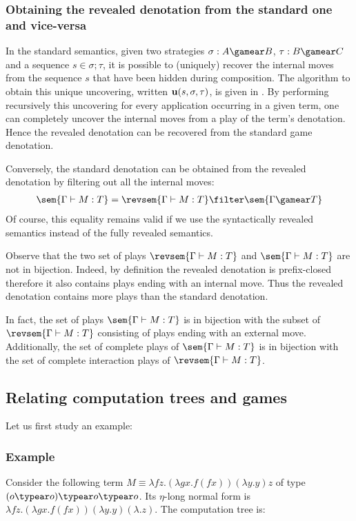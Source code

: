 \subsubsection{Obtaining the revealed denotation from the standard one and vice-versa}
\label{subsec:relating_revealed_and_standard_denotation}

In the standard semantics, given two strategies $\sigma : A
\gamear B$, $\tau : B \gamear C$ and a sequence $s \in
\sigma ; \tau$, it is possible to (uniquely) recover the
internal moves from the sequence $s$ that have been hidden during composition. The algorithm to obtain this unique uncovering, written ${\bf u}(s, \sigma, \tau)$, is given in \cite[part II]{hylandong_pcf}. By performing recursively this uncovering for every application occurring in a given term, one can completely uncover the internal moves from a play of the term's denotation.
Hence the revealed denotation can be recovered from the standard game denotation.

Conversely, the standard denotation can be obtained from the revealed denotation by filtering out all the internal moves:
\begin{eqnarray}
 \sem{\Gamma \vdash M : T} = \revsem{\Gamma \vdash M : T} \filter \sem{\Gamma \gamear T} \label{eqn:int_std_gamsem}
\end{eqnarray}
Of course, this equality remains valid if we use the syntactically revealed semantics instead of the fully revealed semantics.


Observe that the two set of plays $\revsem{\Gamma \vdash M : T}$ and $\sem{\Gamma \vdash M : T}$ are not in bijection.  Indeed, by definition the revealed denotation is prefix-closed therefore it also contains plays ending with an internal move. Thus the revealed denotation contains more plays than the standard denotation.

In fact, the set of plays $\sem{\Gamma \vdash M : T}$ is in bijection with the subset of $\revsem{\Gamma \vdash M : T}$ consisting of plays ending with an external move. Additionally, the set of complete plays of $\sem{\Gamma \vdash M : T}$ is in bijection with the set of complete interaction plays of $\revsem{\Gamma \vdash M : T}$.


\subsection{Relating computation trees and games}
Let us first study an example:
\subsubsection{Example}
Consider the following term $M \equiv \lambda f z . (\lambda g x . f (f x)) (\lambda y. y) z$ of type $(o \typear o) \typear o \typear o$.
Its $\eta$-long normal form is $\lambda f z . (\lambda g x . f (f x)) (\lambda y. y) (\lambda .z)$.
The computation tree is:

